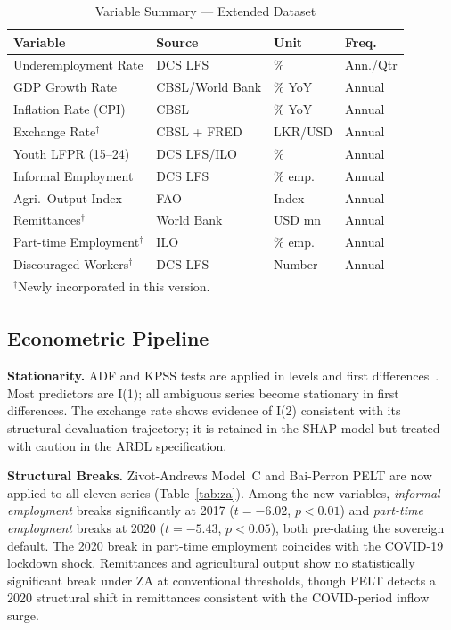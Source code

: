 \documentclass[sigconf]{acmart}
\begin{document}
\begin{table}[h]
\caption{Variable Summary --- Extended Dataset}
\label{tab:variables}
\setlength{\tabcolsep}{3.5pt}
\footnotesize
\begin{tabular}{llll}
\toprule
\textbf{Variable} & \textbf{Source} & \textbf{Unit} & \textbf{Freq.}\\
\midrule
Underemployment Rate    & DCS LFS         & \%       & Ann./Qtr \\
GDP Growth Rate         & CBSL/World Bank & \% YoY   & Annual \\
Inflation Rate (CPI)    & CBSL            & \% YoY   & Annual \\
Exchange Rate$^\dagger$ & CBSL + FRED     & LKR/USD  & Annual \\
Youth LFPR (15--24)     & DCS LFS/ILO     & \%       & Annual \\
Informal Employment     & DCS LFS         & \% emp.  & Annual \\
Agri.\ Output Index     & FAO             & Index    & Annual \\
Remittances$^\dagger$   & World Bank      & USD mn   & Annual \\
Part-time Employment$^\dagger$ & ILO      & \% emp.  & Annual \\
Discouraged Workers$^\dagger$  & DCS LFS  & Number   & Annual \\
\midrule
\multicolumn{4}{l}{\scriptsize $^\dagger$Newly incorporated in this version.}\\
\bottomrule
\end{tabular}
\end{table}

\subsection{Econometric Pipeline}

\textbf{Stationarity.} ADF and KPSS tests are applied in levels and first
differences~\cite{kpss1992}. Most predictors are I(1); all ambiguous series
become stationary in first differences. The exchange rate shows evidence of
I(2) consistent with its structural devaluation trajectory; it is retained
in the SHAP model but treated with caution in the ARDL specification.

\textbf{Structural Breaks.} Zivot-Andrews Model~C and Bai-Perron PELT are
now applied to all eleven series (Table~\ref{tab:za}). Among the new
variables, \emph{informal employment} breaks significantly at 2017
($t{=}{-6.02}$, $p{<}0.01$) and \emph{part-time employment} breaks at 2020
($t{=}{-5.43}$, $p{<}0.05$), both pre-dating the sovereign default. The
2020 break in part-time employment coincides with the COVID-19 lockdown
shock. Remittances and agricultural output show no statistically significant
break under ZA at conventional thresholds, though PELT detects a
2020 structural shift in remittances consistent with the COVID-period
inflow surge.
\end{document}
